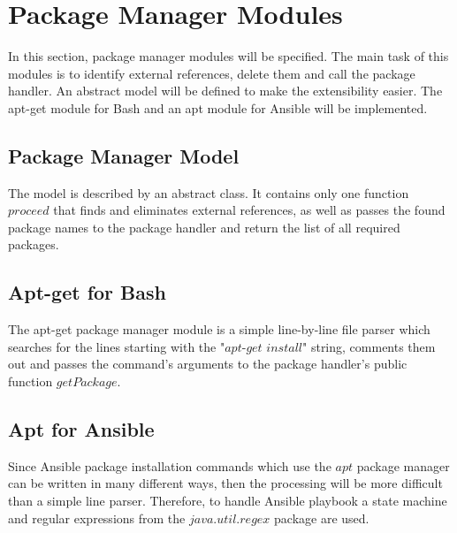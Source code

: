 \section{Package Manager Modules}
In this section, package manager modules will be specified.
The main task of this modules is to identify external references, delete them and call the package handler.
An abstract model will be defined to make the extensibility easier.
The apt-get module for Bash and an apt module for Ansible will be implemented.
\subsection*{Package Manager Model}
The model is described by an abstract class.
It contains only one function $proceed$ that finds and eliminates external references, as well as passes the found package names to the package handler and return the list of all required packages.
%	
%	
%	
%	
\subsection*{Apt-get for Bash}
The apt-get package manager module is a simple line-by-line file parser which searches for the lines starting with the "$apt$-$get$ $install$" string, comments them out and passes the command's arguments to the package handler's public function $getPackage$. 
\subsection*{Apt for Ansible}
Since Ansible package installation commands which use the $apt$ package manager can be written in many different ways, then the processing will be more difficult than a simple line parser.
Therefore, to handle Ansible playbook a state machine and regular expressions from the $java$.$util$.$regex$ package are used.

